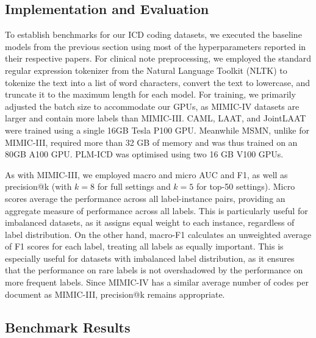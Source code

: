 \documentclass[11pt]{article}
\begin{document}
\subsection{Implementation and Evaluation}
To establish benchmarks for our ICD coding datasets, we executed the baseline models from the previous section using most of the hyperparameters reported in their respective papers. For clinical note preprocessing, we employed the standard regular expression tokenizer from the Natural Language Toolkit (NLTK) to tokenize the text into a list of word characters, convert the text to lowercase, and truncate it to the maximum length for each model. For training, we primarily adjusted the batch size to accommodate our GPUs, as MIMIC-IV datasets are larger and contain more labels than MIMIC-III. CAML, LAAT, and JointLAAT were trained using a single 16GB Tesla P100 GPU. Meanwhile MSMN, unlike for MIMIC-III, required more than 32 GB of memory and was thus trained on an 80GB A100 GPU. PLM-ICD was optimised using two 16 GB V100 GPUs.

As with MIMIC-III, we employed macro and micro AUC and F1, as well as precision@k (with $k=8$ for full settings and $k=5$ for top-50 settings). Micro scores average the performance across all label-instance pairs, providing an aggregate measure of performance across all labels. This is particularly useful for imbalanced datasets, as it assigns equal weight to each instance, regardless of label distribution. On the other hand, macro-F1 calculates an unweighted average of F1 scores for each label, treating all labels as equally important. This is especially useful for datasets with imbalanced label distribution, as it ensures that the performance on rare labels is not overshadowed by the performance on more frequent labels. Since MIMIC-IV has a similar average number of codes per document as MIMIC-III, precision@k remains appropriate.

\subsection{Benchmark Results}
\end{document}

